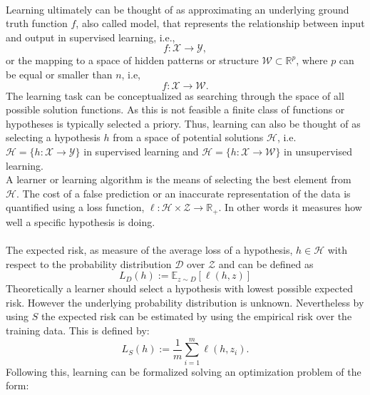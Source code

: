 \begin{tcolorbox}
    \\
    Learning ultimately can be thought of as approximating an underlying ground truth function $f$, also called model, that represents the relationship between input and output in supervised learning, i.e., 
    \begin{equation}
    f:\mathcal{X}\rightarrow\mathcal{Y},
    \end{equation}
    or the mapping to a space of hidden patterns or structure $\mathcal{W}\subset\mathbb{R}^p$, where $p$ can be equal or smaller than $n$, i.e,
    \begin{equation}
    f:\mathcal{X}\rightarrow\mathcal{W}.
    \end{equation}
    The learning task can be conceptualized as searching through the space of all possible solution functions. As this is not feasible a finite class of functions or hypotheses is typically selected a priory. Thus, learning can also be thought of as selecting a hypothesis $h$ from a space of potential solutions $\mathcal{H}$, i.e. $\mathcal{H}=\{h:\mathcal{X}\rightarrow\mathcal{Y}\}$ in supervised learning and $\mathcal{H}=\{h:\mathcal{X}\rightarrow\mathcal{W}\}$ in unsupervised learning. \\
    A learner or learning algorithm is the means of selecting the best element from $\mathcal{H}$.
    The cost of a false prediction or an inaccurate representation of the data is quantified using a loss function, $\ell:\mathcal{H}\times\mathcal{Z}\rightarrow\mathbb{R}_+$. In other words it measures how well a specific hypothesis is doing.\\
    \\
    The expected risk, as measure of the average loss of a hypothesis, $h\in\mathcal{H}$ with respect to the probability distribution $\mathcal{D}$ over $\mathcal{Z}$ and can be defined as
    \begin{equation}
    L_{D}(h):=\mathbb{E}_{z\sim D}[\ell(h,z)]
    \end{equation}
    Theoretically a learner should select a hypothesis with lowest possible expected risk. 
    However the underlying probability distribution is unknown. Nevertheless by using $S$ the expected risk can be estimated by using the empirical risk over the training data. This is defined by:
    \begin{equation}
    L_{S}(h):=\frac{1}{m}\sum_{i=1}^m\ell(h,z_i).
    \end{equation}
    Following this, learning can be formalized solving an optimization problem of the form: 
    \begin{equation}

\end{equation}
\end{tcolorbox}
